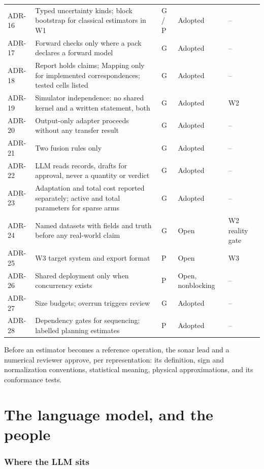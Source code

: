 \documentclass[11pt,a4paper]{article}
\begin{document}
{\begin{longtable}{@{}lp{7.4cm}lp{2.6cm}p{2cm}@{}}
ADR-16 & Typed uncertainty kinds; block bootstrap for classical estimators in W1 & G / P & Adopted & -- \\
ADR-17 & Forward checks only where a pack declares a forward model & G & Adopted & -- \\
ADR-18 & Report holds claims; Mapping only for implemented correspondences; tested cells listed & G & Adopted & -- \\
ADR-19 & Simulator independence: no shared kernel and a written statement, both & G & Adopted & W2 \\
ADR-20 & Output-only adapter proceeds without any transfer result & G & Adopted & -- \\
ADR-21 & Two fusion rules only & G & Adopted & -- \\
ADR-22 & LLM reads records, drafts for approval, never a quantity or verdict & G & Adopted & -- \\
ADR-23 & Adaptation and total cost reported separately; active and total parameters for sparse arms & G & Adopted & -- \\
ADR-24 & Named datasets with fields and truth before any real-world claim & G & Open & W2 reality gate \\
ADR-25 & W3 target system and export format & P & Open & W3 \\
ADR-26 & Shared deployment only when concurrency exists & P & Open, nonblocking & -- \\
ADR-27 & Size budgets; overrun triggers review & G & Adopted & -- \\
ADR-28 & Dependency gates for sequencing; labelled planning estimates & P & Adopted & -- \\
\bottomrule
\end{longtable}}

Before an estimator becomes a reference operation, the sonar lead and a numerical reviewer approve, per representation: its definition, sign and normalization conventions, statistical meaning, physical approximations, and its conformance tests.

\part{The language model, and the people}

\section{Where the LLM sits}
\end{document}
